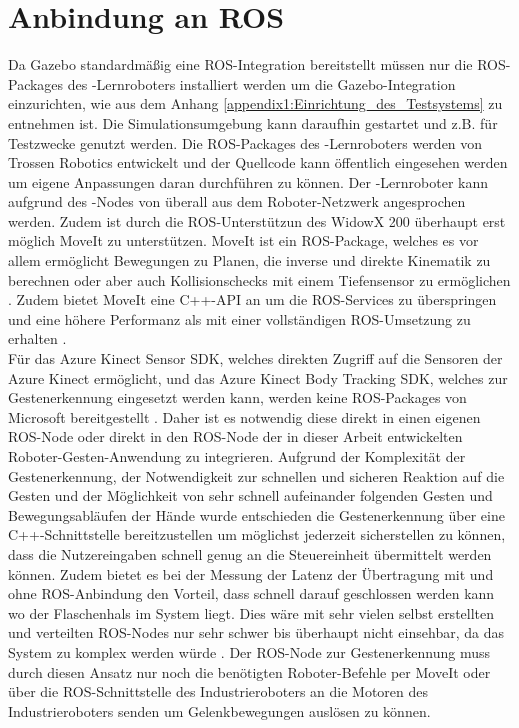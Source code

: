\section{Anbindung an ROS}
Da Gazebo standardmäßig eine ROS-Integration bereitstellt müssen nur die ROS-Packages des -Lernroboters installiert werden um die Gazebo-Integration einzurichten, wie aus dem Anhang \ref{appendix1:Einrichtung_des_Testsystems} zu entnehmen ist. Die Simulationsumgebung kann daraufhin gestartet und z.B. für Testzwecke genutzt werden. Die ROS-Packages des -Lernroboters werden von Trossen Robotics entwickelt und der Quellcode kann öffentlich eingesehen werden um eigene Anpassungen daran durchführen zu können. Der -Lernroboter kann aufgrund des -Nodes von überall aus dem Roboter-Netzwerk angesprochen werden. Zudem ist durch die ROS-Unterstützun des WidowX 200 überhaupt erst möglich MoveIt zu unterstützen. MoveIt ist ein ROS-Package, welches es vor allem ermöglicht Bewegungen zu Planen, die inverse und direkte Kinematik zu berechnen oder aber auch Kollisionschecks mit einem Tiefensensor zu ermöglichen \cite{moveit_nodate}. Zudem bietet MoveIt eine C++-API an um die ROS-Services zu überspringen und eine höhere Performanz als mit einer vollständigen ROS-Umsetzung zu erhalten \cite{moveit_tutorial_nodate}.\\

Für das Azure Kinect Sensor SDK, welches direkten Zugriff auf die Sensoren der Azure Kinect ermöglicht, und das Azure Kinect Body Tracking SDK, welches zur Gestenerkennung eingesetzt werden kann, werden keine ROS-Packages von Microsoft bereitgestellt \cite{tesych_about_azure_kinect_sdks_nodate}. Daher ist es notwendig diese direkt in einen eigenen ROS-Node oder direkt in den ROS-Node der in dieser Arbeit entwickelten Roboter-Gesten-Anwendung zu integrieren. Aufgrund der Komplexität der Gestenerkennung, der Notwendigkeit zur schnellen und sicheren Reaktion auf die Gesten und der Möglichkeit von sehr schnell aufeinander folgenden Gesten und Bewegungsabläufen der Hände wurde entschieden die Gestenerkennung über eine C++-Schnittstelle bereitzustellen um möglichst jederzeit sicherstellen zu können, dass die Nutzereingaben schnell genug an die Steuereinheit übermittelt werden können. Zudem bietet es bei der Messung der Latenz der Übertragung mit und ohne ROS-Anbindung den Vorteil, dass schnell darauf geschlossen werden kann wo der Flaschenhals im System liegt. Dies wäre mit sehr vielen selbst erstellten und verteilten ROS-Nodes nur sehr schwer bis überhaupt nicht einsehbar, da das System zu komplex werden würde \cite{why_dont_we_use_ros_nodate}. Der ROS-Node zur Gestenerkennung muss durch diesen Ansatz nur noch die benötigten Roboter-Befehle per MoveIt oder über die ROS-Schnittstelle des Industrieroboters an die Motoren des Industrieroboters senden um Gelenkbewegungen auslösen zu können.

